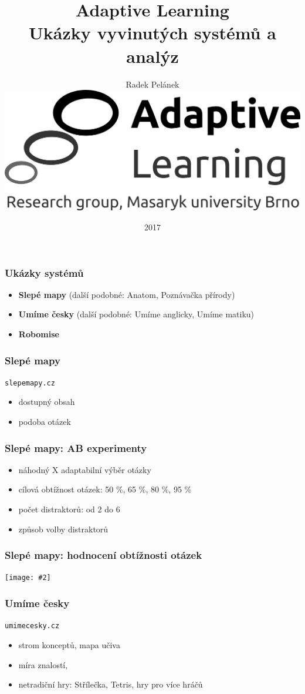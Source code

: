 \documentclass[bigger]{beamer}
\title{Adaptive Learning\\Ukázky vyvinutých systémů a analýz}
\author{Radek Pelánek\\[10mm]
  \includegraphics[width=.2\linewidth]{al-logo-researchgroup}}
\date{2017}
\newcommand{\img}[2]{\begin{center}\texttt{[image: \#2]}\end{center}}
\begin{document}
\frame{\titlepage}

\begin{frame}
  \frametitle{Ukázky systémů}

  \begin{itemize}
  \item \textbf{Slepé mapy} (další podobné: Anatom, Poznávačka přírody)
  \item \textbf{Umíme česky} (další podobné: Umíme anglicky, Umíme matiku)
  \item \textbf{Robomise}
  \end{itemize}
\end{frame}

\begin{frame}
  \frametitle{Slepé mapy}

  \texttt{slepemapy.cz}

  \bigskip

  \begin{itemize}
  \item dostupný obsah
  \item podoba otázek
  \end{itemize}
\end{frame}

\begin{frame}
  \frametitle{Slepé mapy: AB experimenty}

  \begin{itemize}
  \item náhodný X adaptabilní výběr otázky
  \item cílová obtížnost otázek: 50 \%, 65 \%, 80 \%, 95 \%
  \item počet distraktorů: od 2 do 6
  \item způsob volby distraktorů
  \end{itemize}  
\end{frame}

\begin{frame}
  \frametitle{Slepé mapy: hodnocení obtížnosti otázek}

  \img{.95}{ratings}
\end{frame}

\begin{frame}
  \frametitle{Umíme česky}

  \texttt{umimecesky.cz}

  \bigskip

  \begin{itemize}
  \item strom konceptů, mapa učiva
  \item míra znalostí, 
  \item netradiční hry: Střílečka, Tetris, hry pro více hráčů
  \end{itemize}
\end{frame}
\end{document}
